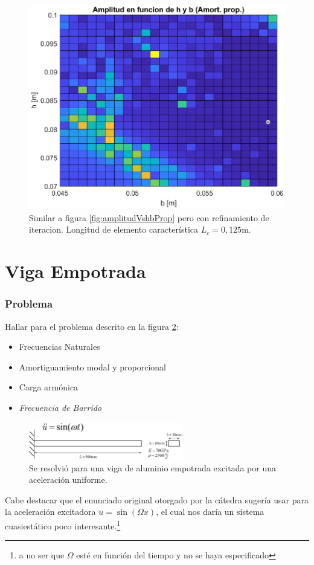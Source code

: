 \documentclass[onecolumn,10pt,titlepage,a4paper]{article}
\begin{document}
\begin{figure}[htb!]
	\centering
	\includegraphics[width=0.7\linewidth]{fig/amplitudVshbPropRefinado.eps}
	\caption{Similar a figura \ref{fig:amplitudVshbProp} pero con refinamiento de iteracion. Longitud de elemento característica $L_c=0,125$m.}
	\label{fig:amplitudVshbPropref}
\end{figure}


\clearpage
\part{Viga Empotrada}

\setcounter{section}{0}
\section{Problema}
Hallar para el problema descrito en la figura \ref{fig:enunciado}:
\begin{itemize}
	\item Frecuencias Naturales
	\item Amortiguamiento modal y proporcional
	\item Carga armónica
	\item \textit{Frecuencia de Barrido}
\end{itemize}

\begin{figure}[htb!]
	\centering
	\includegraphics[width=0.6\textwidth]{fig/enunciado.eps}
	\caption{Se resolvió para una viga de aluminio empotrada excitada por una aceleración uniforme.}\label{fig:enunciado}
\end{figure}
Cabe destacar que el enunciado original otorgado por la cátedra sugería usar para la aceleración excitadora $\ddot{u}=\sin (\Omega x)$, el cual nos daría un sistema cuasiestático poco interesante.\footnote{a no ser que $\Omega$ esté en función del tiempo y no se haya especificado}
\end{document}
